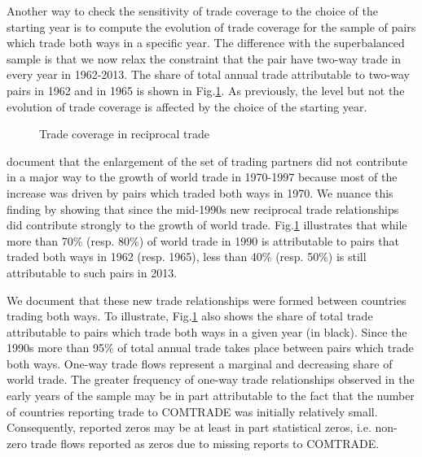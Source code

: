 \documentclass[12pt,twoside,a4paper,notitlepage]{article}
\begin{document}
{Another way to check the sensitivity of trade coverage to the choice of the starting year is to compute the evolution of trade coverage for the sample of pairs which trade both ways in a specific year.
The difference with the superbalanced sample is that we now relax the constraint that the pair have two-way trade in every year in 1962-2013.
The share of total annual trade attributable to two-way pairs in 1962 and in 1965 is shown in Fig.\ref{fig:reciprocal}.
As previously, the level but not the evolution of trade coverage is affected by the choice of the starting year.

\begin{figure}[h!]
\begin{center}
\setlength{\fboxrule}{1pt} %
\setlength{\fboxsep}{.1in} %
\end{center}
\caption{Trade coverage in reciprocal trade \label{fig:reciprocal}}
\end{figure}

\cite{Helpman2008} document that the enlargement of the set of trading partners did not contribute in a major way to the growth of world trade in 1970-1997 because most of the increase was driven by pairs which traded both ways in 1970.
We nuance this finding by showing that since the mid-1990s new reciprocal trade relationships did contribute strongly to the growth of world trade.
Fig.\ref{fig:reciprocal} illustrates that while more than 70\% (resp.
80\%) of world trade in 1990 is attributable to pairs that traded both ways in 1962 (resp.
1965), less than 40\% (resp.
50\%) is still attributable to such pairs in 2013.
  

We document that these new trade relationships were formed between countries trading both ways.
To illustrate, Fig.\ref{fig:reciprocal} also shows the share of total trade attributable to pairs which trade both ways in a given year (in black).
Since the 1990s more than 95\% of total annual trade takes place between pairs which trade both ways.
One-way trade flows represent a marginal and decreasing share of world trade.
The greater frequency of one-way trade relationships observed in the early years of the sample may be in part attributable to the fact that the number of countries reporting trade to COMTRADE was initially relatively small.
Consequently, reported zeros may be at least in part statistical zeros, i.e.
non-zero trade flows reported as zeros due to missing reports to COMTRADE.


}
\end{document}
